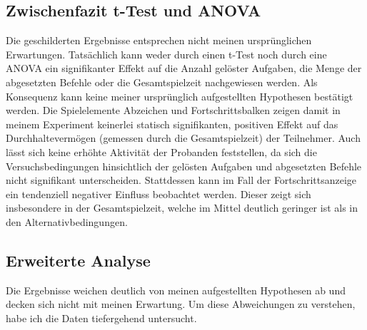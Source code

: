 \subsection{Zwischenfazit t-Test und ANOVA}
Die geschilderten Ergebnisse entsprechen nicht meinen ursprünglichen Erwartungen. Tatsächlich kann weder durch einen t-Test noch durch eine ANOVA ein signifikanter Effekt auf die Anzahl gelöster Aufgaben, die Menge der abgesetzten Befehle oder die Gesamtspielzeit nachgewiesen werden. Als Konsequenz kann keine meiner ursprünglich aufgestellten Hypothesen bestätigt werden. Die Spielelemente Abzeichen und Fortschrittsbalken zeigen damit in meinem Experiment keinerlei statisch signifikanten, positiven Effekt auf das Durchhaltevermögen (gemessen durch die Gesamtspielzeit) der Teilnehmer. Auch lässt sich keine erhöhte Aktivität der Probanden feststellen, da sich die Versuchsbedingungen hinsichtlich der gelösten Aufgaben und abgesetzten Befehle nicht signifikant unterscheiden. Stattdessen kann im Fall der Fortschrittsanzeige ein tendenziell negativer Einfluss beobachtet werden. Dieser zeigt sich insbesondere in der Gesamtspielzeit, welche im Mittel deutlich geringer ist als in den Alternativbedingungen. 

\subsection{Erweiterte Analyse}
Die Ergebnisse weichen deutlich von meinen aufgestellten Hypothesen ab und decken sich nicht mit meinen Erwartung. Um diese Abweichungen zu verstehen, habe ich die Daten tiefergehend untersucht.

